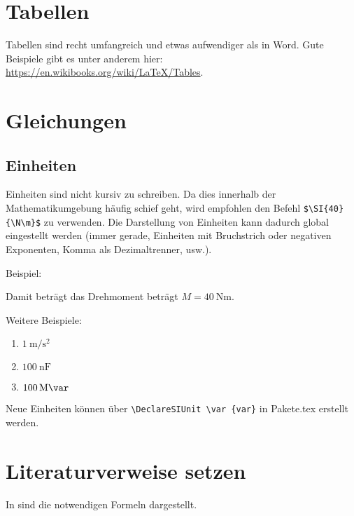 \section{Tabellen}

Tabellen sind recht umfangreich und etwas aufwendiger als in Word. Gute Beispiele gibt es unter anderem hier: \href{https://en.wikibooks.org/wiki/LaTeX/Tables}{https://en.wikibooks.org/wiki/LaTeX/Tables}.

\section{Gleichungen}

\subsection{Einheiten}
Einheiten sind nicht kursiv zu schreiben. Da dies innerhalb der Mathematikumgebung häufig schief geht, wird empfohlen den Befehl \verb=$\SI{40}{\N\m}$= zu verwenden. Die Darstellung von Einheiten kann dadurch global eingestellt werden (immer gerade, Einheiten mit Bruchstrich oder negativen Exponenten, Komma als Dezimaltrenner, usw.).

Beispiel:

Damit beträgt das Drehmoment beträgt $M=\SI{40}{\N\m}$.

Weitere Beispiele:
\begin{enumerate}
	\item $\SI{1}{\meter\per\square\second}$
	\item $\SI{100}{\nano\farad}$
	\item $\SI{100}{\mega\var}$
\end{enumerate}
Neue Einheiten können über  \verb!\DeclareSIUnit \var {var}! in \glqq  Pakete.tex\grqq{} erstellt werden.

\section{Literaturverweise setzen}

In \cite{ASYN:2001} sind die notwendigen Formeln dargestellt.